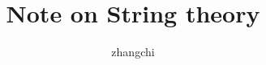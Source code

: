 \documentclass[11pt,a4paper]{book}
\begin{document}
\begin{CJK*}{UTF8}{gbsn}
\CJKindent





\title{Note on String theory}
\author{zhangchi}
\date{}

\maketitle

\tableofcontents 





\end{CJK*}
\end{document}

